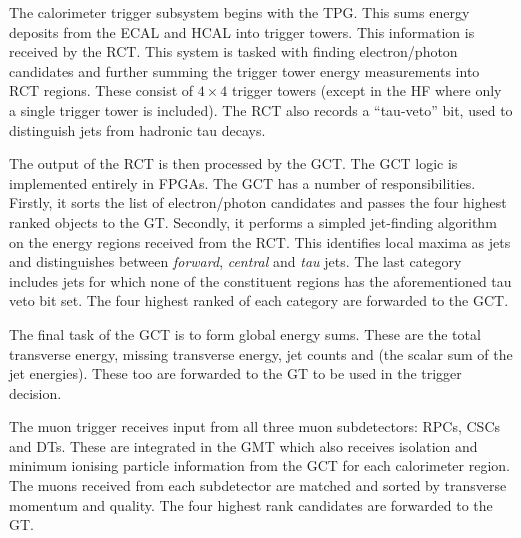 The calorimeter trigger subsystem begins with the \ac{TPG}. This sums energy
deposits from the \ac{ECAL} and \ac{HCAL} into trigger towers. This information
is received by the \ac{RCT}. This system is tasked with finding electron/photon
candidates and further summing the trigger tower energy measurements into
\ac{RCT} regions. These consist of $4\times 4$ trigger towers (except in the
\ac{HF} where only a single trigger tower is included). The \ac{RCT} also
records a ``tau-veto'' bit, used to distinguish jets from hadronic tau decays.

The output of the \ac{RCT} is then processed by the \ac{GCT}. The \ac{GCT} logic
is implemented entirely in \acp{FPGA}. The \ac{GCT} has a number of
responsibilities. Firstly, it sorts the list of electron/photon candidates and
passes the four highest ranked objects to the \ac{GT}. Secondly, it
performs a simpled jet-finding algorithm on the energy regions received from the
\ac{RCT}. This identifies local maxima as jets and distinguishes between
\emph{forward}, \emph{central} and \emph{tau} jets. The last category includes
jets for which none of the constituent regions has the aforementioned tau veto
bit set. The four highest ranked of each category are forwarded to the \ac{GCT}.

The final task of the \ac{GCT} is to form global energy sums. These are the
total transverse energy, missing transverse energy, jet counts and \HT (the
scalar sum of the jet energies). These too are forwarded to the \ac{GT} to be
used in the trigger decision.

The muon trigger receives input from all three muon subdetectors: \acp{RPC},
\acp{CSC} and \acp{DT}. These are integrated in the \ac{GMT} which also receives
isolation and minimum ionising particle information from the \ac{GCT} for each
calorimeter region. The muons received from each subdetector are matched and
sorted by transverse momentum and quality. The four highest rank candidates are
forwarded to the \ac{GT}.
